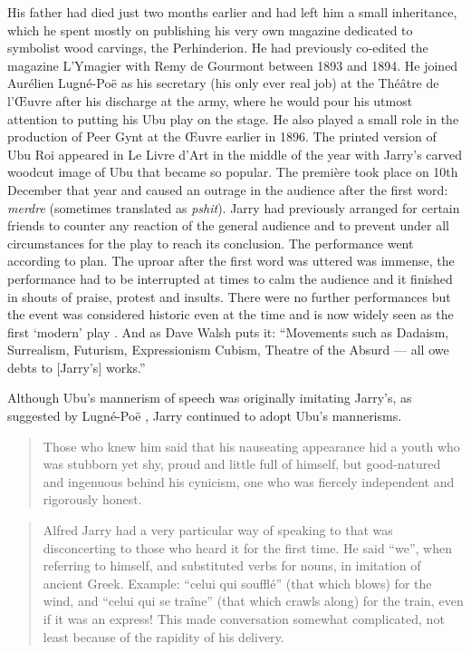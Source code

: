 His father had died just two months earlier and had left him a small inheritance, which he spent mostly on publishing his very own magazine dedicated to symbolist wood carvings, the Perhinderion. He had previously co-edited the magazine L'Ymagier with Remy de Gourmont between 1893 and 1894. He joined Aurélien Lugné-Poë as his secretary (his only ever real job) at the Théâtre de l'Œuvre after his discharge at the army, where he would pour his utmost attention to putting his Ubu play on the stage. He also played a small role in the production of Peer Gynt at the Œuvre earlier in 1896. The printed version of Ubu Roi appeared in Le Livre d'Art in the middle of the year with Jarry's carved woodcut image of Ubu that became so popular. The première took place on 10th December that year and caused an outrage in the audience after the first word: \emph{merdre} (sometimes translated as \emph{pshit}). Jarry had previously arranged for certain friends to counter any reaction of the general audience and to prevent under all circumstances for the play to reach its conclusion. The performance went according to plan. The uproar after the first word was uttered was immense, the performance had to be interrupted at times to calm the audience and it finished in shouts of praise, protest and insults. There were no further performances but the event was considered historic even at the time and is now widely seen as the first `modern' play \autocite[p.168-169]{Brotchie2011a}. And as Dave Walsh puts it: ``Movements such as Dadaism, Surrealism, Futurism, Expressionism Cubism, Theatre of the Absurd --- all owe debts to [Jarry's] works.'' \citeyear{Walsh2001}

Although Ubu's mannerism of speech was originally imitating Jarry's, as suggested by Lugné-Poë \autocite[p.155]{Brotchie2011a}, Jarry continued to adopt Ubu's mannerisms.

\begin{quotation}
  Those who knew him said that his nauseating appearance hid a youth who was stubborn yet shy, proud and little full of himself, but good-natured and ingenuous behind his cynicism, one who was fiercely independent and rigorously honest. 
\end{quotation}

\begin{quotation}
  Alfred Jarry had a very particular way of speaking to that was disconcerting to those who heard it for the first time. He said ``we'', when referring to himself, and substituted verbs for nouns, in imitation of ancient Greek. Example: ``celui qui soufflé'' (that which blows) for the wind, and ``celui qui se traîne'' (that which crawls along) for the train, even if it was an express! This made conversation somewhat complicated, not least because of the rapidity of his delivery. 
\end{quotation}

